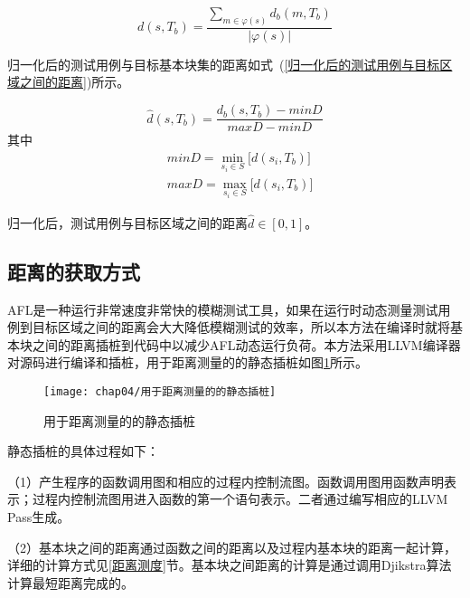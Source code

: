 \begin{equation}\label{测试用例与目标区域之间的距离}
d(s,T_b) = \frac{\sum_{m \in \varphi(s)} d_{b}(m,T_b) }{|\varphi(s)|}
\end{equation}

归一化后的测试用例与目标基本块集的距离如式~(\ref{归一化后的测试用例与目标区域之间的距离})所示。

\begin{equation}\label{归一化后的测试用例与目标区域之间的距离}
\hat{d}(s,T_b) = \frac{d_{b}(s,T_b)-minD }{maxD-minD}
\end{equation}
其中
\begin{equation}\label{minD和maxD的定义}
\begin{aligned}
& minD = \min\limits_{s_{i} \in S}\lbrack d(s_{i}, T_b) \rbrack \\
& maxD = \max\limits_{s_{i} \in S}\lbrack d(s_{i}, T_b) \rbrack
\end{aligned}
\end{equation}

归一化后，测试用例与目标区域之间的距离$\hat{d} \in [0,1]$。

\subsection{距离的获取方式}
AFL是一种运行非常速度非常快的模糊测试工具，如果在运行时动态测量测试用例到目标区域之间的距离会大大降低模糊测试的效率，所以本方法在编译时就将基本块之间的距离插桩到代码中以减少AFL动态运行负荷。本方法采用LLVM编译器对源码进行编译和插桩，用于距离测量的的静态插桩如图\ref{用于距离测量的的静态插桩}所示。

\begin{figure}[htb]
\begin{center}
\texttt{[image: chap04/用于距离测量的的静态插桩]}
\end{center}
\caption{用于距离测量的的静态插桩}
\label{用于距离测量的的静态插桩}
\end{figure}

静态插桩的具体过程如下：

（1）产生程序的函数调用图和相应的过程内控制流图。函数调用图用函数声明表示；过程内控制流图用进入函数的第一个语句表示。二者通过编写相应的LLVM Pass生成。

（2）基本块之间的距离通过函数之间的距离以及过程内基本块的距离一起计算，详细的计算方式见\ref{距离测度}节。基本块之间距离的计算是通过调用Djikstra算法计算最短距离完成的。

